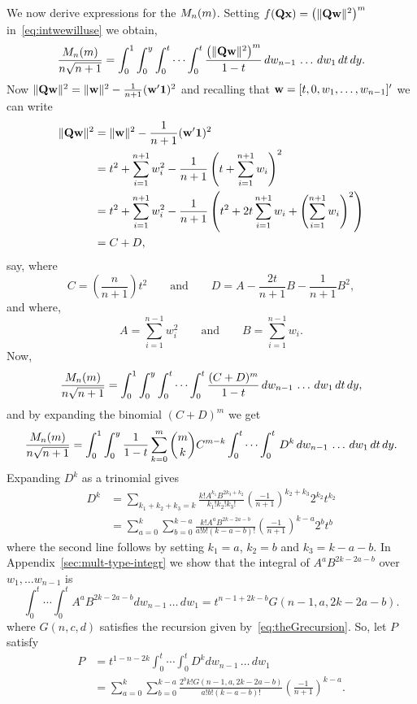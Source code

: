 \documentclass[draftcls, onecolumn, 11pt]{IEEEtran}
\begin{document}
We now derive expressions for the $M_n(m)$.  Setting $f(\mathbf{Q}\mathbf{x}) = \left(\|\mathbf{Q}\mathbf{w}\|^{2}\right)^m$ in~\eqref{eq:intwewilluse} we obtain,
\[
\frac{M_n(m)}{n\sqrt{n+1}} = \int_0^1 \int_0^y \int_0^t \cdots \int_0^t \frac{\left(\|\mathbf{Q}\mathbf{w}\|^2\right)^m}{1 - t} \,dw_{n-1} \, \dots \, dw_1 \, dt \, dy.
\]
Now $\|\mathbf{Q}\mathbf{w}\|^2 = \|\mathbf{w}\|^2 - \frac{1}{n+1}(\mathbf{w}^\prime \boldsymbol{1})^2$ and recalling that $\mathbf{w} = [t,0,w_1,\dots,w_{n-1}]'$ we can write
\begin{align*}
\|\mathbf{Q}\mathbf{w}\|^2 &= \|\mathbf{w}\|^2 - \frac{1}{n+1}(\mathbf{w}^\prime \boldsymbol{1})^2 \\
&= t^2 + \sum_{i=1}^{n+1}w_i^2 - \frac{1}{n+1}\left( t + \sum_{i=1}^{n+1}w_i \right)^2 \\
&= t^2 + \sum_{i=1}^{n+1}w_i^2 - \frac{1}{n+1}\left( t^2 + 2 t \sum_{i=1}^{n+1}w_i + \left(\sum_{i=1}^{n+1}w_i \right)^2 \right)\\
&= C + D,
\end{align*}
say, where
\[
C = \left(\frac{n}{n+1} \right) t^2 \qquad \text{and} \qquad D = A - \frac{2t}{n+1}B - \frac{1}{n+1}B^2,
\]
and where,
\[
 A = \sum_{i=1}^{n-1}w_i^2 \qquad \text{and} \qquad B = \sum_{i=1}^{n-1}w_i.
\]
Now,
\[
 \frac{M_n(m)}{n\sqrt{n+1}} =  \int_0^1 \int_0^y \int_0^t \cdots \int_0^t \frac{(C+D)^m}{1 - t} \,dw_{n-1} \, \dots \, dw_1 \, dt \, dy,
\]
and by expanding the binomial $(C+D)^m$ we get
\[
\frac{M_n(m)}{n\sqrt{n+1}} =  \int_0^1 \int_0^y \frac{1}{1 - t}\sum_{k=0}^{m}\binom{m}{k} C^{m-k} \int_0^t \cdots \int_0^t \, D^{k} \,dw_{n-1} \, \dots \, dw_1 \, dt \, dy.
\]
Expanding $D^k$ as a trinomial gives
\begin{align*}
D^k &= \sum_{k_1+k_2+k_3=k} \frac{k! A^{k_1} B^{2k_3 + k_2}}{k_1! k_2! k_3!} \left(\frac{-1}{n+1}\right)^{k_2+k_3}2^{k_2}t^{k_2}  \\
&=  \sum_{a=0}^k\sum_{b=0}^{k-a} \frac{k!  A^{a} B^{2k - 2a - b}}{a! b! (k-a-b)!} \left(\frac{-1}{n+1}\right)^{k - a}2^{b}t^{b}
\end{align*}
where the second line follows by setting $k_1 = a$, $k_2 = b$ and $k_3 = k - a - b$.  In Appendix~\ref{sec:mult-type-integr} we show that the integral of $A^{a} B^{2k - 2a - b}$ over $w_1,\dots w_{n-1}$ is
\begin{equation} \label{eq:recurseint}
\int_0^t \cdots \int_0^t A^{a} B^{2k-2a-b} dw_{n-1} \, \dots \, dw_1 = t^{n-1+2k - b} G(n-1,a,2k - 2a - b).
\end{equation}
where $G(n,c,d)$ satisfies the recursion given by~\eqref{eq:theGrecursion}.  So, let $P$ satisfy
\begin{align*}
P &= t^{1 - n - 2k}\int_0^t \cdots \int_0^t D^k dw_{n-1} \, \dots \, dw_1 \\
&= \sum_{a=0}^k\sum_{b=0}^{k-a} \frac{2^{b} k!G(n-1,a,2k - 2a - b)}{a! b! (k-a-b)!} \left(\frac{-1}{n+1}\right)^{k - a}.
\end{align*}
\end{document}

